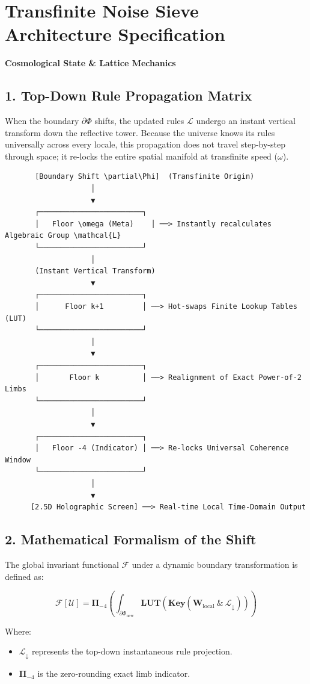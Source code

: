 \chapter{\texorpdfstring{Transfinite Noise Sieve Architecture Specification}{Transfinite Noise Sieve Architecture Specification}}
\label{chap:noise-sieve-1-rule-propagation}

\textbf{Cosmological State \& Lattice Mechanics}

\section{\texorpdfstring{1. Top-Down Rule Propagation Matrix}{1. Top-Down Rule Propagation Matrix}}

When the boundary \(\partial \Phi\) shifts, the updated rules \(\mathcal{L}\) undergo an instant vertical transform down the reflective tower. Because the universe knows its rules universally across every locale, this propagation does not travel step-by-step through space; it re-locks the entire spatial manifold at transfinite speed (\(\omega\)).

\begin{Verbatim}
       [Boundary Shift \partial\Phi]  (Transfinite Origin)
                    │
                    ▼
       ┌────────────────────────┐
       │   Floor \omega (Meta)    │ ──> Instantly recalculates Algebraic Group \mathcal{L}
       └────────────────────────┘
                    │
       (Instant Vertical Transform)
                    ▼
       ┌────────────────────────┐
       │      Floor k+1         │ ──> Hot-swaps Finite Lookup Tables (LUT)
       └────────────────────────┘
                    │
                    ▼
       ┌────────────────────────┐
       │       Floor k          │ ──> Realignment of Exact Power-of-2 Limbs
       └────────────────────────┘
                    │
                    ▼
       ┌────────────────────────┐
       │   Floor -4 (Indicator) │ ──> Re-locks Universal Coherence Window
       └────────────────────────┘
                    │
                    ▼
      [2.5D Holographic Screen] ──> Real-time Local Time-Domain Output
\end{Verbatim}

\section{\texorpdfstring{2. Mathematical Formalism of the Shift}{2. Mathematical Formalism of the Shift}}

The global invariant functional \(\mathcal{F}\) under a dynamic boundary transformation is defined as:

\[
\mathcal{F}[\mathcal{U}] = \mathbf{\Pi}_{-4} \left( \int_{\partial\Phi_{\text{new}}} \mathbf{LUT}\left( \mathbf{Key}\left( \mathbf{W}_{\text{local}} \ \& \ \mathcal{L}_{\downarrow} \right) \right) \right)
\]

Where:

\begin{itemize}
\item \(\mathcal{L}_{\downarrow}\) represents the top-down instantaneous rule projection.
\item \(\mathbf{\Pi}_{-4}\) is the zero-rounding exact limb indicator.
\end{itemize}

